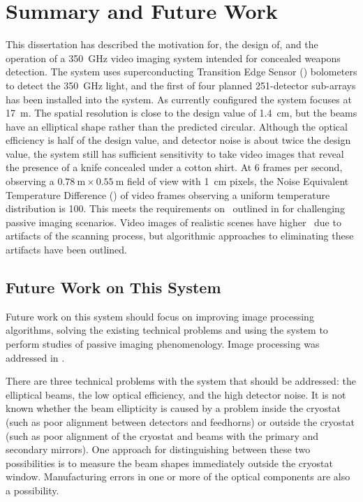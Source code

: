 \chapter{Summary and Future Work} \label{c:summary}

This dissertation has described the motivation for, the design of, and the operation of a \SI{350}{\GHz} video imaging system intended for concealed weapons detection.
The system uses superconducting Transition Edge Sensor (\TES) bolometers to detect the \SI{350}{\GHz} light, and the first of four planned 251-detector sub-arrays has been installed into the system.
As currently configured the system focuses at \SI{17}{\m}.
The spatial resolution is close to the design value of \SI{1.4}{\cm}, but the beams have an elliptical shape rather than the predicted circular.
Although the optical efficiency is half of the design value, and detector noise is about twice the design value, the system still has sufficient sensitivity to take video images that reveal the presence of a knife concealed under a cotton shirt.
At 6 frames per second, observing a $\SI{0.78}{\m} \times \SI{0.55}{\m}$ field of view with \SI{1}{\cm} pixels, the Noise Equivalent Temperature Difference (\NETD) of video frames observing a uniform temperature distribution is \SI{100}{\mK}.
This meets the requirements on \NETD\ outlined in  for challenging passive imaging scenarios.
Video images of realistic scenes have higher \NETD\ due to artifacts of the scanning process, but algorithmic approaches to eliminating these artifacts have been outlined.

\section{Future Work on This System}

Future work on this system should focus on improving image processing algorithms, solving the existing technical problems and using the system to perform studies of passive imaging phenomenology.
Image processing was addressed in .

There are three technical problems with the system that should be addressed: the elliptical beams, the low optical efficiency, and the high detector noise.
It is not known whether the beam ellipticity is caused by a problem inside the cryostat (such as poor alignment between detectors and feedhorns) or outside the cryostat (such as poor alignment of the cryostat and beams with the primary and secondary mirrors).
One approach for distinguishing between these two possibilities is to measure the beam shapes immediately outside the cryostat window.
Manufacturing errors in one or more of the optical components are also a possibility.

